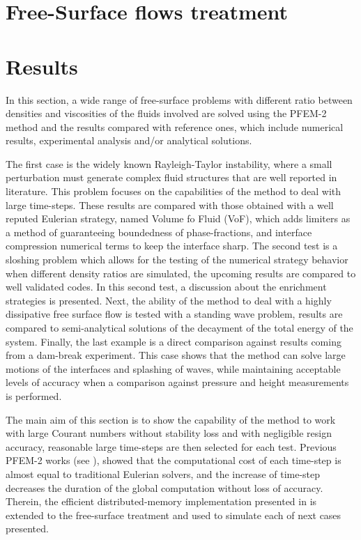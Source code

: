 \documentclass[review]{elsarticle}
\begin{document}
\section[Free-Surface treatment]{Free-Surface flows treatment}\label{Free_surface}



% 

\section{Results}\label{FS_results}

In this section, a wide range of free-surface problems with different ratio between densities and viscosities of the fluids involved are solved using the PFEM-2 method and the results compared with reference ones, which include numerical results, experimental analysis and/or analytical solutions.

The first case is the widely known Rayleigh-Taylor instability, where a small perturbation must generate complex fluid structures that are well reported in literature.
This problem focuses on the capabilities of the method to deal with large time-steps. These results are compared with those obtained with a well reputed Eulerian strategy, named Volume fo Fluid (VoF), which adds limiters as a method of guaranteeing boundedness of phase-fractions, and interface compression numerical terms to keep the interface sharp.
The second test is a sloshing problem which allows for the testing of the numerical strategy behavior when different density ratios are simulated, the upcoming results are compared to well validated codes. In this second test, a discussion about the enrichment strategies is presented. Next, the ability of the method to deal with a highly dissipative free surface flow is tested with a standing wave problem, results are compared to semi-analytical solutions of the decayment of the total energy of the system.
Finally, the last example is a direct comparison against results coming from a dam-break experiment.
This case shows that the method can solve large motions of the interfaces and splashing of waves, while maintaining acceptable levels of accuracy when a comparison against pressure and height measurements is performed.

The main aim of this section is to show the capability of the method to work with large Courant numbers without stability loss and with negligible resign accuracy, reasonable large time-steps are then selected for each test. Previous PFEM-2 works (see \cite{Idelsohn12b}\cite{Gimenez14}), showed that the computational cost of each time-step is almost equal to traditional Eulerian solvers, and the increase of time-step decreases the duration of the global computation without loss of accuracy. Therein, the efficient distributed-memory implementation presented in \cite{Gimenez14} is extended to the free-surface treatment and used to simulate each of next cases presented.
\end{document}
